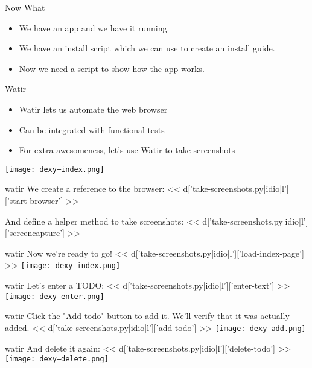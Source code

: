 \documentclass{beamer}
\begin{document}
\begin{frame}{Now What}
\begin{itemize}
\item{We have an app and we have it running.}
\item{We have an install script which we can use to create an install guide.}
\item{Now we need a script to show how the app works.}
\end{itemize}
\end{frame}

\begin{frame}{Watir}
\begin{itemize}
\item{Watir lets us automate the web browser}
\item{Can be integrated with functional tests}
\item{For extra awesomeness, let's use Watir to take screenshots}
\end{itemize}
\texttt{[image: dexy--index.png]}
\end{frame}

\begin{frame}[fragile]{watir}
\normalsize
We create a reference to the browser:
\scriptsize
<< d['take-screenshots.py|idio|l']['start-browser'] >>

\normalsize
And define a helper method to take screenshots:
\scriptsize
<< d['take-screenshots.py|idio|l']['screencapture'] >>
\end{frame}

\begin{frame}[fragile]{watir}
\normalsize
Now we're ready to go!
\scriptsize
<< d['take-screenshots.py|idio|l']['load-index-page'] >>
\texttt{[image: dexy--index.png]}
\end{frame}

\begin{frame}[fragile]{watir}
\normalsize
Let's enter a TODO:
\scriptsize
<< d['take-screenshots.py|idio|l']['enter-text'] >>
\texttt{[image: dexy--enter.png]}
\end{frame}

\begin{frame}[fragile]{watir}
Click the "Add todo" button to add it. We'll verify that it was actually added.
\scriptsize
<< d['take-screenshots.py|idio|l']['add-todo'] >>
\texttt{[image: dexy--add.png]}
\end{frame}

\begin{frame}[fragile]{watir}
\normalsize
And delete it again:
\scriptsize
<< d['take-screenshots.py|idio|l']['delete-todo'] >>
\texttt{[image: dexy--delete.png]}
\end{frame}
\end{document}
